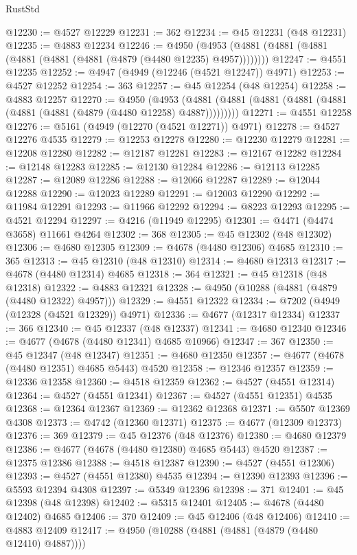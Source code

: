 \begin{lexlean}{RustStd}
\begin{coremodule}
@12230 := @4527 @12229
@12231 := 362
@12234 := @45 @12231 (@48 @12231)
@12235 := @4883 @12234
@12246 := @4950 (@4953 (@4881 (@4881 (@4881 (@4881 (@4881 (@4881 (@4879 (@4480 @12235) @4957))))))))
@12247 := @4551 @12235
@12252 := @4947 (@4949 (@12246 (@4521 @12247)) @4971)
@12253 := @4527 @12252
@12254 := 363
@12257 := @45 @12254 (@48 @12254)
@12258 := @4883 @12257
@12270 := @4950
    (@4953 (@4881 (@4881 (@4881 (@4881 (@4881 (@4881 (@4881 (@4879 (@4480 @12258) @4887)))))))))
@12271 := @4551 @12258
@12276 := @5161 (@4949 (@12270 (@4521 @12271)) @4971)
@12278 := @4527 @12276 @4535
@12279 := @12253 @12278
@12280 := @12230 @12279
@12281 := @12208 @12280
@12282 := @12187 @12281
@12283 := @12167 @12282
@12284 := @12148 @12283
@12285 := @12130 @12284
@12286 := @12113 @12285
@12287 := @12089 @12286
@12288 := @12066 @12287
@12289 := @12044 @12288
@12290 := @12023 @12289
@12291 := @12003 @12290
@12292 := @11984 @12291
@12293 := @11966 @12292
@12294 := @8223 @12293
@12295 := @4521 @12294
@12297 := @4216 (@11949 @12295)
@12301 := @4471 (@4474 @3658) @11661 @4264
@12302 := 368
@12305 := @45 @12302 (@48 @12302)
@12306 := @4680 @12305
@12309 := @4678 (@4480 @12306) @4685
@12310 := 365
@12313 := @45 @12310 (@48 @12310)
@12314 := @4680 @12313
@12317 := @4678 (@4480 @12314) @4685
@12318 := 364
@12321 := @45 @12318 (@48 @12318)
@12322 := @4883 @12321
@12328 := @4950 (@10288 (@4881 (@4879 (@4480 @12322) @4957)))
@12329 := @4551 @12322
@12334 := @7202 (@4949 (@12328 (@4521 @12329)) @4971)
@12336 := @4677 (@12317 @12334)
@12337 := 366
@12340 := @45 @12337 (@48 @12337)
@12341 := @4680 @12340
@12346 := @4677 (@4678 (@4480 @12341) @4685 @10966)
@12347 := 367
@12350 := @45 @12347 (@48 @12347)
@12351 := @4680 @12350
@12357 := @4677 (@4678 (@4480 @12351) @4685 @5443) @4520
@12358 := @12346 @12357
@12359 := @12336 @12358
@12360 := @4518 @12359
@12362 := @4527 (@4551 @12314)
@12364 := @4527 (@4551 @12341)
@12367 := @4527 (@4551 @12351) @4535
@12368 := @12364 @12367
@12369 := @12362 @12368
@12371 := @5507 @12369 @4308
@12373 := @4742 (@12360 @12371)
@12375 := @4677 (@12309 @12373)
@12376 := 369
@12379 := @45 @12376 (@48 @12376)
@12380 := @4680 @12379
@12386 := @4677 (@4678 (@4480 @12380) @4685 @5443) @4520
@12387 := @12375 @12386
@12388 := @4518 @12387
@12390 := @4527 (@4551 @12306)
@12393 := @4527 (@4551 @12380) @4535
@12394 := @12390 @12393
@12396 := @5593 @12394 @4308
@12397 := @5349 @12396
@12398 := 371
@12401 := @45 @12398 (@48 @12398)
@12402 := @5315 @12401
@12405 := @4678 (@4480 @12402) @4685
@12406 := 370
@12409 := @45 @12406 (@48 @12406)
@12410 := @4883 @12409
@12417 := @4950 (@10288 (@4881 (@4881 (@4879 (@4480 @12410) @4887))))

\end{coremodule}
\end{lexlean}
